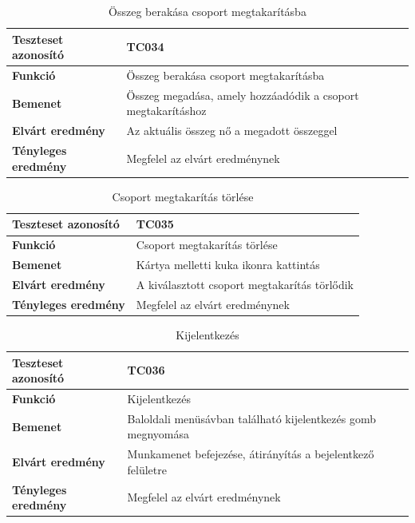 \begin{table}[h!]
	\centering
	\begin{tabular}{|l|p{10cm}|}
		\hline
		\textbf{Teszteset azonosító} & TC034 \\ \hline
		\textbf{Funkció} & Összeg berakása csoport megtakarításba \\ \hline
		\textbf{Bemenet} & Összeg megadása, amely hozzáadódik a csoport megtakarításhoz \\ \hline
		\textbf{Elvárt eredmény} & Az aktuális összeg nő a megadott összeggel \\ \hline
		\textbf{Tényleges eredmény} & Megfelel az elvárt eredménynek \\ \hline
	\end{tabular}
	\caption{Összeg berakása csoport megtakarításba}
	\label{tab:csoport_megtakaritas_berakas}
\end{table}

\begin{table}[h!]
	\centering
	\begin{tabular}{|l|p{10cm}|}
		\hline
		\textbf{Teszteset azonosító} & TC035 \\ \hline
		\textbf{Funkció} & Csoport megtakarítás törlése \\ \hline
		\textbf{Bemenet} & Kártya melletti kuka ikonra kattintás \\ \hline
		\textbf{Elvárt eredmény} & A kiválasztott csoport megtakarítás törlődik \\ \hline
		\textbf{Tényleges eredmény} & Megfelel az elvárt eredménynek \\ \hline
	\end{tabular}
	\caption{Csoport megtakarítás törlése}
	\label{tab:csoport_megtakaritas_torles}
\end{table}

\begin{table}[h!]
	\centering
	\begin{tabular}{|l|p{10cm}|}
		\hline
		\textbf{Teszteset azonosító} & TC036 \\ \hline
		\textbf{Funkció} & Kijelentkezés \\ \hline
		\textbf{Bemenet} & Baloldali menüsávban található kijelentkezés gomb megnyomása \\ \hline
		\textbf{Elvárt eredmény} & Munkamenet befejezése, átirányítás a bejelentkező felületre \\ \hline
		\textbf{Tényleges eredmény} & Megfelel az elvárt eredménynek \\ \hline
	\end{tabular}
	\caption{Kijelentkezés}
	\label{tab:kijelentkezes}
\end{table}


